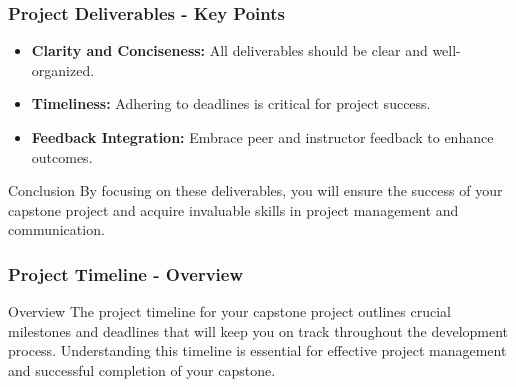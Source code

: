 \documentclass[aspectratio=169]{beamer}
\begin{document}
\begin{frame}[fragile]
    \frametitle{Project Deliverables - Key Points}
    \begin{itemize}
        \item \textbf{Clarity and Conciseness:} All deliverables should be clear and well-organized.
        \item \textbf{Timeliness:} Adhering to deadlines is critical for project success.
        \item \textbf{Feedback Integration:} Embrace peer and instructor feedback to enhance outcomes.
    \end{itemize}
    \begin{block}{Conclusion}
        By focusing on these deliverables, you will ensure the success of your capstone project and acquire invaluable skills in project management and communication.
    \end{block}
\end{frame}

\begin{frame}[fragile]
  \frametitle{Project Timeline - Overview}
  \begin{block}{Overview}
    The project timeline for your capstone project outlines crucial milestones and deadlines that will keep you on track throughout the development process. Understanding this timeline is essential for effective project management and successful completion of your capstone.
  \end{block}
\end{frame}
\end{document}
